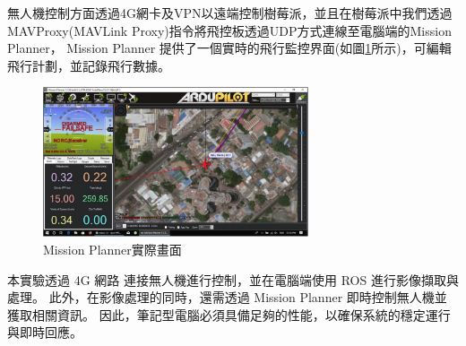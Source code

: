 \documentclass[12pt]{article}       %
\begin{document}
無人機控制方面透過4G網卡及VPN以遠端控制樹莓派，並且在樹莓派中我們透過MAVProxy(MAVLink Proxy)\cite{mavproxy_2023}指令將飛控板透過UDP方式連線至電腦端的Mission Planner\cite{pixhawk_2023}，
Mission Planner 提供了一個實時的飛行監控界面(如圖\ref{fig:missionplanner}所示)，可編輯飛行計劃，並記錄飛行數據。
\begin{figure}[H]
    \centering
    \includegraphics[width=0.7\textwidth]{missionplanner.jpg}     %
    \caption{Mission Planner實際畫面\cite{pixhawk_2023}}    %
    \label{fig:missionplanner}    %
\end{figure}
本實驗透過 4G 網路 連接無人機進行控制，並在電腦端使用 ROS 進行影像擷取與處理。
此外，在影像處理的同時，還需透過 Mission Planner 即時控制無人機並獲取相關資訊。
因此，筆記型電腦必須具備足夠的性能，以確保系統的穩定運行與即時回應。
\end{document}
